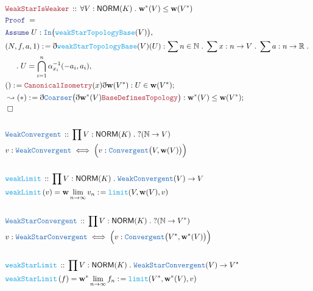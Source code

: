 \documentclass[12pt]{scrartcl}
\newcommand{\TYPE}[1]{\textcolor{NavyBlue}{\mathtt{#1}}}
\newcommand{\FUNC}[1]{\textcolor{Cerulean}{\mathtt{#1}}}
\newcommand{\LOGIC}[1]{\textcolor{Blue}{\mathtt{#1}}}
\newcommand{\THM}[1]{\textcolor{Maroon}{\mathtt{#1}}}
\renewcommand{\.}{\; . \;}
\newcommand{\de}{: \kern 0.1pc =}
\newcommand{\Act}[1]{\left( #1 \right)}
\newcommand{\Theorem}[2]{& \THM{#1} \, :: \, #2 \\ & \Proof = \\ }
\newcommand{\DeclareType}[2]{& \TYPE{#1} \, :: \, #2 \\}
\newcommand{\DefineType}[3]{& #1 : \TYPE{#2} \iff #3 \\}
\newcommand{\DeclareFunc}[2]{& \FUNC{#1} \, :: \, #2 \\}
\newcommand{\DefineNamedFunc}[4]{&  \FUNC{#1}\Act{#2} = #3 \de #4 \\}
\newcommand{\NewLine}{\\ & \kern 1pc}
\newcommand{\Page}[1]{\begin{align*} #1 \end{align*} \newpage   }
\newcommand{ \bd }{ \ByDef }
\newcommand{\Reals}{\mathbb{R} }
\newcommand{\Nat}{\mathbb{N} }
\newcommand{\Say}[3]{& #1 \de #2 : #3, \\}
\newcommand{\Conclude}[3]{& #1 \de #2 : #3; \\}
\newcommand{\DeriveConclude}[3]{& \leadsto #1 \de #2 : #3 ; \\}
\newcommand{\A}{\LOGIC{Assume} \;}
\newcommand{\Assume}[2]{& \A #1 : #2, \\}
\newcommand{\QED}{\; \square}
\newcommand{\EndProof}{& \QED \\}
\newcommand{\ByDef}{\eth}
\newcommand{\Proof}{\LOGIC{Proof} \; }
\newcommand{\NORM}{\textsf{NORM}}
\begin{document}
\Page{
 \Theorem{WeakStarIsWeaker}{\forall V : \NORM(K) \. \mathbf{w}^*(V) \le \mathbf{w}(V^*)}
 \Assume{U}{\TYPE{In}\big(\FUNC{weakStarTopologyBase}(V)\big)}
\Say{(N,f,a,1)}{\bd \FUNC{weakStarTopologyBase}(V)(U) }{ \sum n \in \Nat \. \sum x : n \to V \. \sum a : n \to \Reals \.
 \NewLine \.
 U = \bigcap^n_{i = 1} \alpha_{x_i}^{-1}(-a_i,a_i)}
\Conclude{()}{\THM{CanonicalIsometry}(x)\bd \mathbf{w}(V^*)}
{U \in \mathbf{w}(V^*)}
\DeriveConclude{(*)}{ \bd \TYPE{Coarser}\big( \bd \mathbf{w}^*(V)\THM{BaseDefinesTopology}\big)}{\mathbf{w}^*(V) \le \mathbf{w}(V^*)}
\EndProof
\\
\DeclareType{WeakConvergent}{\prod V : \NORM(K) \. ?(\Nat \to V)}
\DefineType{v}{WeakConvergent}{\Big(v : \TYPE{Convergent}\big(V,\mathbf{w}(V)\big)\Big)}
\\
\DeclareFunc{weakLimit}{\prod V : \NORM(K) \. \TYPE{WeakConvergent}(V) \to V }
\DefineNamedFunc{weakLimit}{v}{\mathbf{w} \- \lim_{n \to \infty} v_n}{ \FUNC{limit}(V,\mathbf{w}(V),v) }
\\
\DeclareType{WeakStarConvergent}{\prod V : \NORM(K) \. ?(\Nat \to V^*)}
\DefineType{v}{WeakStarConvergent}{\Big(v : \TYPE{Convergent}\big(V^*,\mathbf{w}^*(V)\big)\Big)}
\\
\DeclareFunc{weakStarLimit}{\prod V : \NORM(K) \. \TYPE{WeakStarConvergent}(V) \to V^* }
\DefineNamedFunc{weakStarLimit}{f}{\mathbf{w}^* \- \lim_{n \to \infty} f_n}{ \FUNC{limit}(V^*,\mathbf{w}^*(V),v) }
}
\end{document}
